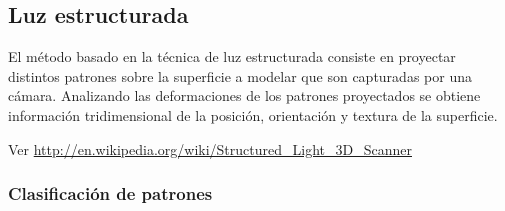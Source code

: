 \subsection{Luz estructurada}

El método basado en la técnica de luz estructurada consiste en proyectar distintos patrones sobre la superficie a modelar que son capturadas por una cámara. Analizando las deformaciones de los patrones proyectados se obtiene información tridimensional de la posición, orientación y textura de la superficie\cite{SLightPatterns}.

Ver \url{http://en.wikipedia.org/wiki/Structured_Light_3D_Scanner}

\subsubsection{Clasificación de patrones}

